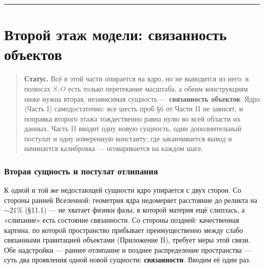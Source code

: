 \documentclass{article}
\begin{document}
\bigskip
\hrule
\bigskip

\part{Второй этаж модели: связанность объектов}

\begin{quote}
\textbf{Статус.} Всё в этой части опирается на ядро, но не выводится из него: в полюсах $S, O$ есть только перетекание масштаба, а обеим конструкциям ниже нужна вторая, независимая сущность --- \textbf{связанность объектов}. Ядро (Часть I) самодостаточно: все шесть проб \S6 от Части II не зависят, и поправка второго этажа тождественно равна нулю во всей области их данных. Часть II вводит одну новую сущность, один дополнительный постулат и одну измеренную константу; где заканчивается вывод и начинается калибровка --- оговаривается на каждом шаге.
\end{quote}

\section{Вторая сущность и постулат отлипания}

К одной и той же недостающей сущности ядро упирается с двух сторон. Со стороны ранней Вселенной: геометрия ядра недомеряет расстояние до реликта на ${\sim}21\%$ (\S11.1) --- не хватает физики фазы, в которой материя ещё слиплась, а «слипание» есть состояние связанности. Со стороны поздней: качественная картина, по которой пространство прибывает преимущественно между слабо связанными гравитацией объектами (Приложение B), требует меры этой связи. Обе надстройки --- раннее отлипание и позднее распределение пространства --- суть два проявления одной новой сущности: \textbf{связанности}. Вводим её один раз.
\end{document}
